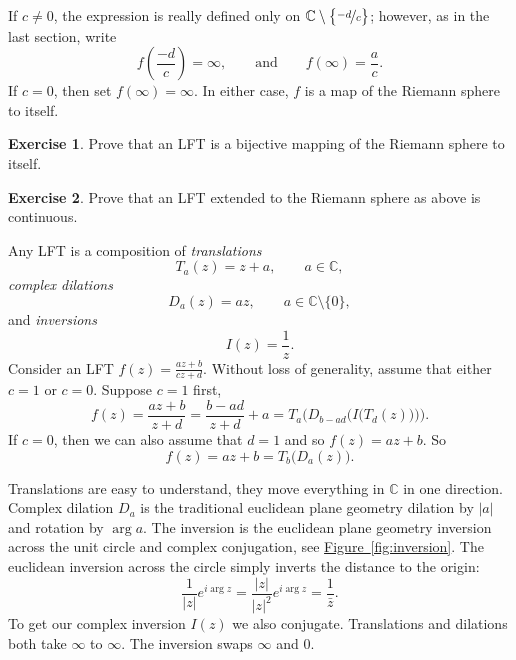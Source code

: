 \documentclass[12pt,openany]{book}
\newcommand{\sabs}[1]{\lvert {#1} \rvert}
\newcommand{\C}{{\mathbb{C}}}
\theoremstyle{plain}
\theoremstyle{remark}
\theoremstyle{definition}
\newenvironment{exbox}{%
    \def\FrameCommand{\vrule width 1pt \relax\hspace{10pt}}%
    \MakeFramed{\advance\hsize-\width\FrameRestore}%
}{%
    \endMakeFramed
}
\theoremstyle{exercise}
\newtheorem{exercise}{Exercise}[section]
\theoremstyle{example}
\newcommand{\figureref}[1]{\hyperref[#1]{Figure~\ref*{#1}}}
\begin{document}
If $c\not=0$,
the expression is really defined only on
$\C \setminus \bigl\{ \nicefrac{-d}{c} \bigr\}$;
however, as in the last section, write
\begin{equation*}
f\left(\frac{-d}{c}\right) = \infty, \qquad \text{and} \qquad
f(\infty) = \frac{a}{c} .
\end{equation*}
If $c=0$, then set $f(\infty) = \infty$.  In either case, $f$ is a map of
the Riemann sphere to itself.

\begin{exbox}
\begin{exercise}%
Prove that an LFT is a bijective mapping of the Riemann sphere to itself.
\end{exercise}

\begin{exercise}%
Prove that an LFT extended to the Riemann sphere as above is continuous.
\end{exercise}
\end{exbox}

Any LFT is a composition of \emph{translations}
\begin{equation*}
T_a(z) = z + a , \qquad a \in \C,
\end{equation*}
\emph{complex dilations}
\begin{equation*}
D_a(z) = az , \qquad a \in \C \setminus \{ 0 \} ,
\end{equation*}
and \emph{inversions}
\begin{equation*}
I(z) = \frac{1}{z}.
\end{equation*}
Consider an LFT $f(z) = \frac{az+b}{cz+d}$.
Without loss of generality, assume that either $c=1$ or $c=0$.
Suppose $c=1$ first,
\begin{equation*}
f(z)
=
\frac{a z + b}{z + d}
=
\frac{b-ad}{z+d}+a
=
T_a\biggr(D_{b-ad}\Bigr(I\bigl(T_d(z)\bigr)\Bigr)\biggr) .
\end{equation*}
If $c=0$, then we can also assume that $d=1$ and
so $f(z) = az + b$.  So
\begin{equation*}
f(z) = az+b = T_b\bigl(D_a(z)\bigr) .
\end{equation*}

Translations are easy to understand, they move everything in $\C$ in one
direction.  Complex
dilation $D_a$ is the traditional euclidean plane geometry dilation by $\sabs{a}$
and rotation by $\arg a$.
The inversion is the euclidean plane geometry inversion
across the unit circle
and complex conjugation, see \figureref{fig:inversion}.  The euclidean
inversion across the circle simply inverts the distance to the origin:
\begin{equation*}
\frac{1}{\sabs{z}} e^{i \arg z} = 
\frac{\sabs{z}}{\sabs{z}^2} e^{i \arg z} = \frac{1}{\bar{z}} .
\end{equation*}
To get our complex inversion $I(z)$ we also conjugate.
Translations and dilations both take $\infty$ to $\infty$.
The inversion swaps $\infty$ and $0$.
\end{document}
